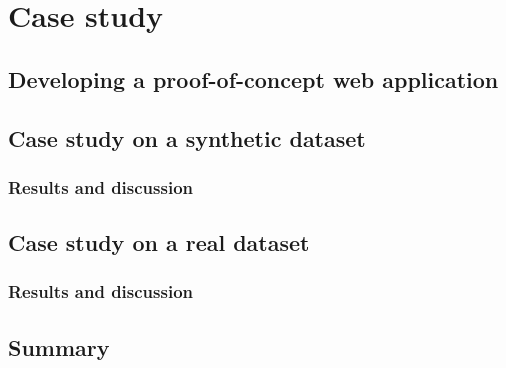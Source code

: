\chapter{Case study}\label{CaseStudy}
\ifpdf
    \graphicspath{{Chapter5/Chapter5Figs/PNG/}{Chapter5/Chapter5Figs/PDF/}{Chapter5/Chapter5Figs/}}
\else
    \graphicspath{{Chapter5/Chapter5Figs/EPS/}{Chapter5/Chapter5Figs/}}
\fi

\section{Developing a proof-of-concept web application}\label{WebApp}

\section{Case study on a synthetic dataset}
\subsection{Results and discussion}

\section{Case study on a real dataset}
\subsection{Results and discussion}

\section{Summary}




